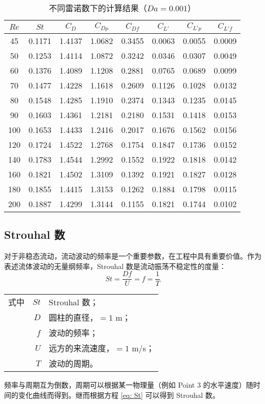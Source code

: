 \begin{table}[ht]
	\caption{不同雷诺数下的计算结果（$Da=0.001$）}\label{tab: results-1e-3}
	\vspace{.5em}\centering\wuhao
	\begin{tabular}{*{8}{c}}
		\toprule[1.5pt]
		$Re$ & $St$ & $C_D$ & $C_{Dp}$ & $C_{Df}$ & $C_{L'}$ & $C_{L'p}$ & $C_{L'f}$ \\
		\midrule[1pt]
		45  & 0.1171 & 1.4137 & 1.0682 & 0.3455 & 0.0063 & 0.0055 & 0.0009 \\
		50  & 0.1253 & 1.4114 & 1.0872 & 0.3242 & 0.0346 & 0.0307 & 0.0049 \\
		60  & 0.1376 & 1.4089 & 1.1208 & 0.2881 & 0.0765 & 0.0689 & 0.0099 \\
		70  & 0.1477 & 1.4228 & 1.1618 & 0.2609 & 0.1126 & 0.1028 & 0.0132 \\
		80  & 0.1548 & 1.4285 & 1.1910 & 0.2374 & 0.1343 & 0.1235 & 0.0145 \\
		90  & 0.1603 & 1.4361 & 1.2181 & 0.2180 & 0.1531 & 0.1418 & 0.0153 \\
		100 & 0.1653 & 1.4433 & 1.2416 & 0.2017 & 0.1676 & 0.1562 & 0.0156 \\
		120 & 0.1724 & 1.4522 & 1.2768 & 0.1754 & 0.1847 & 0.1736 & 0.0152 \\
		140 & 0.1783 & 1.4544 & 1.2992 & 0.1552 & 0.1922 & 0.1818 & 0.0142 \\
		160 & 0.1821 & 1.4502 & 1.3109 & 0.1392 & 0.1921 & 0.1827 & 0.0128 \\
		180 & 0.1855 & 1.4415 & 1.3153 & 0.1262 & 0.1884 & 0.1798 & 0.0115 \\
		200 & 0.1887 & 1.4299 & 1.3144 & 0.1155 & 0.1821 & 0.1744 & 0.0102 \\
		\bottomrule[1.5pt]
	\end{tabular}
\end{table}

\subsection{Strouhal 数}

对于非稳态流动，流动波动的频率是一个重要参数，在工程中具有重要价值。作为表述流体波动的无量纲频率，Strouhal 数是流动振荡不稳定性的度量：
\begin{equation}\label{eq: St}
	St = \frac{Df}{U} = f = \frac{1}{T}
\end{equation}
\begin{tabularx}{\textwidth}{@{}l@{\quad}r@{——}X@{}}
	式中 & $St$ & Strouhal 数；\\
		& $D$ & 圆柱的直径，$=1$ m；\\
		& $f$ & 波动的频率；\\
		& $U$ & 远方的来流速度，$=1$ m/s；\\
		& $T$ & 波动的周期。 
\end{tabularx}\vspace{3.15bp}
频率与周期互为倒数，周期可以根据某一物理量（例如 Point 3 的水平速度）随时间的变化曲线而得到。继而根据方程 \eqref{eq: St} 可以得到 Strouhal 数。%

